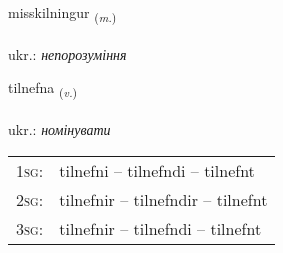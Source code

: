 \documentclass[frontgrid, backgrid]{flacards}\usepackage[]{graphicx}\usepackage[]{xcolor}
\begin{document}
\renewcommand{\flhead}{\vskip5pt \fboxsep=0pt {\small\bfseries\footnotesize Nafnorð | іменник}}
\renewcommand{\fcfoot}{\vskip5pt \fboxsep=0pt \hspace{2pt}{\small\bfseries\footnotesize 3K}}

\renewcommand{\blhead}{\vskip5pt {\small\bfseries\footnotesize Nafnorð | іменник }}
\renewcommand{\bcfoot}{\vskip5pt \hspace{2pt}{\small\bfseries\footnotesize 3K}}


{misskilningur \small{\textsubscript{(\textit{m.})}} \\[1ex] %
\textphonetic{[mɪːscɪlniŋkʏr]} \\
ukr.: \emph{непорозуміння} \\  [2ex]
\renewcommand*{\arraystretch}{0.8}
}

\renewcommand{\flhead}{\vskip5pt \fboxsep=0pt {\small\bfseries\footnotesize Sagnorð | дієслово}}
\renewcommand{\fcfoot}{\vskip5pt \fboxsep=0pt \hspace{2pt}{\small\bfseries\footnotesize 3K}}

\renewcommand{\blhead}{\vskip5pt {\small\bfseries\footnotesize Sagnorð | дієслово }}
\renewcommand{\bcfoot}{\vskip5pt \hspace{2pt}{\small\bfseries\footnotesize 3K}}


{tilnefna \small{\textsubscript{(\textit{v.})}} \\[1ex] %
\textphonetic{[tʰɪlnɛpna]} \\
ukr.: \emph{номінувати} \\  [2ex]
\renewcommand*{\arraystretch}{0.8}
\begin{tabular}{p{1cm}l}
\textsc{1sg}: & tilnefni -- tilnefndi -- tilnefnt \\ 
\textsc{2sg}: & tilnefnir -- tilnefndir -- tilnefnt \\ 
\textsc{3sg}: & tilnefnir -- tilnefndi -- tilnefnt \\ 
\end{tabular}
}
\end{document}
